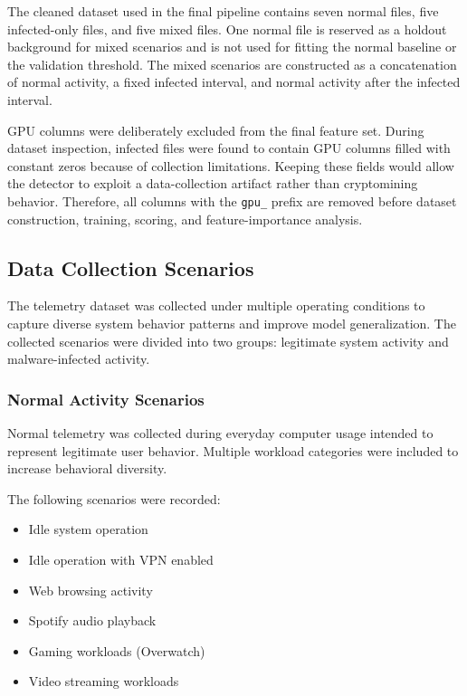 \documentclass[a4paper,12pt]{extarticle}
\begin{document}
The cleaned dataset used in the final pipeline contains seven normal files, five infected-only files, and five mixed files. One normal file is reserved as a holdout background for mixed scenarios and is not used for fitting the normal baseline or the validation threshold. The mixed scenarios are constructed as a concatenation of normal activity, a fixed infected interval, and normal activity after the infected interval.

GPU columns were deliberately excluded from the final feature set. During dataset inspection, infected files were found to contain GPU columns filled with constant zeros because of collection limitations. Keeping these fields would allow the detector to exploit a data-collection artifact rather than cryptomining behavior. Therefore, all columns with the \texttt{gpu\_} prefix are removed before dataset construction, training, scoring, and feature-importance analysis.

\subsection{Data Collection Scenarios}

The telemetry dataset was collected under multiple operating conditions to capture diverse system behavior patterns and improve model generalization. The collected scenarios were divided into two groups: legitimate system activity and malware-infected activity.

\subsubsection{Normal Activity Scenarios}

Normal telemetry was collected during everyday computer usage intended to represent legitimate user behavior. Multiple workload categories were included to increase behavioral diversity.

The following scenarios were recorded:

\begin{itemize}
    \item Idle system operation
    \item Idle operation with VPN enabled
    \item Web browsing activity
    \item Spotify audio playback
    \item Gaming workloads (Overwatch)
    \item Video streaming workloads
\end{itemize}
\end{document}
